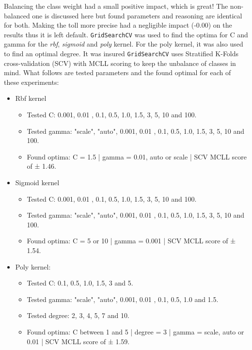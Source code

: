 Balancing the class weight had a small positive impact, which is great!
The non-balanced one is discussed here but found parameters and reasoning are identical for both.
Making the toll more precise had a negligible impact (-0.00) on the results thus it is left default.
\texttt{GridSearchCV} was used to find the optima for C and gamma for the \textit{rbf}, \textit{sigmoid} and \textit{poly} kernel.
For the poly kernel, it was also used to find an optimal degree.
It was insured \texttt{GridSearchCV} uses Stratified K-Folds cross-validation (SCV) with MCLL scoring to keep the unbalance of classes in mind.
What follows are tested parameters and the found optimal for each of these experiments:
\begin{itemize}
    \item Rbf kernel
    \begin{itemize}
        \item Tested C: 0.001, 0.01 , 0.1, 0.5, 1.0, 1.5, 3, 5, 10 and 100.
        \item Tested gamma: "scale", "auto", 0.001, 0.01 , 0.1, 0.5, 1.0, 1.5, 3, 5, 10 and 100.
        \item Found optima: C = 1.5 | gamma = 0.01, auto or scale | SCV MCLL score of ± 1.46.
    \end{itemize}
    \item Sigmoid kernel
    \begin{itemize}
        \item Tested C: 0.001, 0.01 , 0.1, 0.5, 1.0, 1.5, 3, 5, 10 and 100.
        \item Tested gamma: "scale", "auto", 0.001, 0.01 , 0.1, 0.5, 1.0, 1.5, 3, 5, 10 and 100.
        \item Found optima: C = 5 or 10 | gamma = 0.001 | SCV MCLL score of ± 1.54.
    \end{itemize}
    \item Poly kernel:
    \begin{itemize}
        \item Tested C: 0.1, 0.5, 1.0, 1.5, 3 and 5.
        \item Tested gamma: "scale", "auto", 0.001, 0.01 , 0.1, 0.5, 1.0 and 1.5.
        \item Tested degree: 2, 3, 4, 5, 7 and 10.
        \item Found optima: C between 1 and 5 | degree = 3 | gamma = scale, auto or 0.01  | SCV MCLL score of ± 1.59.
    \end{itemize}
\end{itemize}

